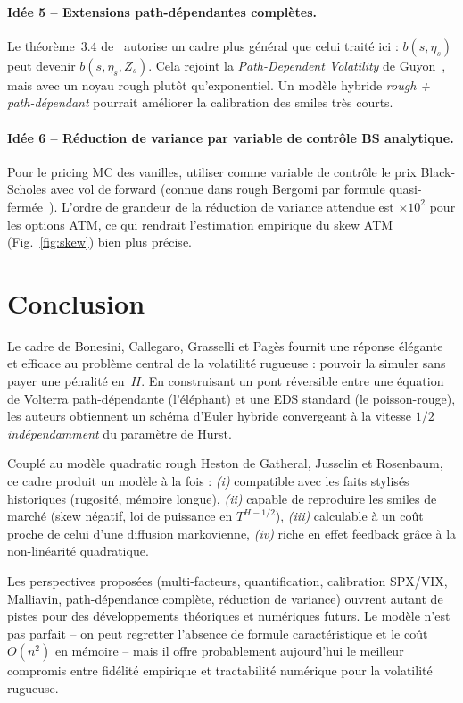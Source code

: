 \documentclass[11pt,a4paper]{article}
\theoremstyle{definition}
\newcommand{\1}{\mathbf{1}}
\begin{document}
\paragraph{Idée 5 -- Extensions path-dépendantes complètes.}
Le théorème~3.4 de~\cite{BCGP23} autorise un cadre plus général que celui traité
ici : $b(s, \eta_s)$ peut devenir $b(s, \eta_s, Z_s)$. Cela rejoint la
\emph{Path-Dependent Volatility} de Guyon~\cite{G22}, mais avec un noyau rough
plutôt qu'exponentiel. Un modèle hybride \textit{rough + path-dépendant}
pourrait améliorer la calibration des smiles très courts.

\paragraph{Idée 6 -- Réduction de variance par variable de contrôle BS analytique.}
Pour le pricing MC des vanilles, utiliser comme variable de contrôle le prix
Black-Scholes avec vol de forward (connue dans rough Bergomi par formule
quasi-fermée~\cite{Bergomi16}). L'ordre de grandeur de la réduction de
variance attendue est $\times 10^2$ pour les options ATM, ce qui rendrait
l'estimation empirique du skew ATM (Fig.~\ref{fig:skew}) bien plus précise.

\section{Conclusion}

Le cadre de Bonesini, Callegaro, Grasselli et Pagès fournit une réponse
élégante et efficace au problème central de la volatilité rugueuse : pouvoir la
simuler sans payer une pénalité en~$H$. En construisant un pont réversible
entre une équation de Volterra path-dépendante (l'éléphant) et une EDS standard
(le poisson-rouge), les auteurs obtiennent un schéma d'Euler hybride convergeant
à la vitesse $1/2$ \emph{indépendamment} du paramètre de Hurst.

Couplé au modèle quadratic rough Heston de Gatheral, Jusselin et Rosenbaum,
ce cadre produit un modèle à la fois :
\emph{(i)} compatible avec les faits stylisés historiques (rugosité, mémoire longue),
\emph{(ii)} capable de reproduire les smiles de marché (skew négatif, loi de puissance
en $T^{H-1/2}$),
\emph{(iii)} calculable à un coût proche de celui d'une diffusion markovienne,
\emph{(iv)} riche en effet feedback grâce à la non-linéarité quadratique.

Les perspectives proposées (multi-facteurs, quantification, calibration SPX/VIX,
Malliavin, path-dépendance complète, réduction de variance) ouvrent autant de
pistes pour des développements théoriques et numériques futurs. Le modèle n'est
pas parfait -- on peut regretter l'absence de formule caractéristique et le coût
$O(n^2)$ en mémoire -- mais il offre probablement aujourd'hui le meilleur compromis
entre fidélité empirique et tractabilité numérique pour la volatilité rugueuse.
\end{document}
